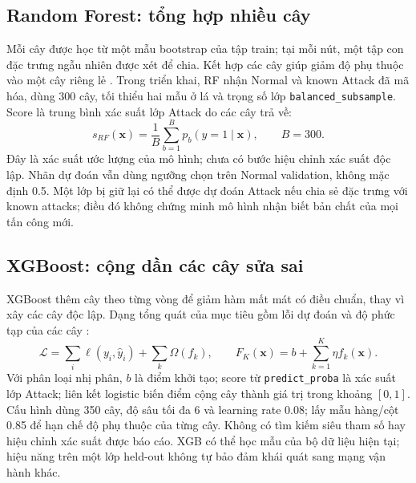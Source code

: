 \subsection{Random Forest: tổng hợp nhiều cây}
Mỗi cây được học từ một mẫu bootstrap của tập train; tại mỗi nút, một tập con đặc trưng ngẫu nhiên được xét để chia. Kết hợp các cây giúp giảm độ phụ thuộc vào một cây riêng lẻ \cite{breiman2001}. Trong triển khai, RF nhận Normal và known Attack đã mã hóa, dùng 300 cây, tối thiểu hai mẫu ở lá và trọng số lớp \texttt{balanced\_subsample}. Score là trung bình xác suất lớp Attack do các cây trả về:
\begin{equation}
s_{RF}(\mathbf{x})=\frac{1}{B}\sum_{b=1}^{B}p_b(y=1\mid\mathbf{x}),\qquad B=300.
\end{equation}
Đây là xác suất ước lượng của mô hình; chưa có bước hiệu chỉnh xác suất độc lập. Nhãn dự đoán vẫn dùng ngưỡng chọn trên Normal validation, không mặc định 0.5. Một lớp bị giữ lại có thể được dự đoán Attack nếu chia sẻ đặc trưng với known attacks; điều đó không chứng minh mô hình nhận biết bản chất của mọi tấn công mới.

\subsection{XGBoost: cộng dần các cây sửa sai}
XGBoost thêm cây theo từng vòng để giảm hàm mất mát có điều chuẩn, thay vì xây các cây độc lập. Dạng tổng quát của mục tiêu gồm lỗi dự đoán và độ phức tạp của các cây \cite{chen2016}:
\begin{equation}
\mathcal{L}=\sum_i\ell(y_i,\hat y_i)+\sum_k\Omega(f_k),\qquad
F_K(\mathbf{x})=b+\sum_{k=1}^{K}\eta f_k(\mathbf{x}).
\end{equation}
Với phân loại nhị phân, $b$ là điểm khởi tạo; score từ \texttt{predict\_proba} là xác suất lớp Attack; liên kết logistic biến điểm cộng cây thành giá trị trong khoảng $[0,1]$. Cấu hình dùng 350 cây, độ sâu tối đa 6 và learning rate 0.08; lấy mẫu hàng/cột 0.85 để hạn chế độ phụ thuộc của từng cây. Không có tìm kiếm siêu tham số hay hiệu chỉnh xác suất được báo cáo. XGB có thể học mẫu của bộ dữ liệu hiện tại; hiệu năng trên một lớp held-out không tự bảo đảm khái quát sang mạng vận hành khác.

